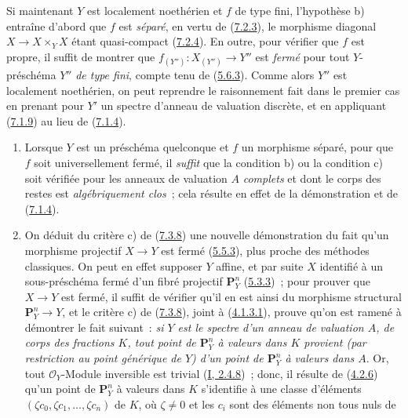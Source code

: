 Si maintenant $Y$ est localement noethérien et $f$ de type fini, l'hypothèse
b) entraîne d'abord que $f$ est \emph{séparé}, en vertu de
(\hyperref[II.7.2.3-fr]{7.2.3}), le morphisme diagonal $X\to X\times_YX$
étant quasi-compact (\hyperref[II.7.2.4-fr]{7.2.4}). En outre, pour vérifier
que $f$ est propre, il suffit de montrer que $f_{(Y'')}:X_{(Y'')}\to Y''$ est
\emph{fermé} pour tout $Y$-préschéma $Y''$ \emph{de type fini}, compte tenu de
(\hyperref[II.5.6.3-fr]{5.6.3}). Comme alors $Y''$ est localement noethérien,
on peut reprendre le raisonnement fait dans le premier cas en prenant pour
$Y'$ un spectre d'anneau de valuation discrète, et en appliquant
(\hyperref[II.7.1.9-fr]{7.1.9}) au lieu de
(\hyperref[II.7.1.4-fr]{7.1.4}).

\begin{remark}[7.3.9]
\label{II.7.3.9-fr}
\begin{enumerate}
\item[\rm (i)] Lorsque $Y$ est un préschéma quelconque et $f$ un morphisme
séparé, pour que $f$ soit universellement fermé, il \emph{suffit} que la
condition b) ou la condition c) soit vérifiée pour les anneaux de valuation
$A$ \emph{complets} et dont le corps des restes est \emph{algébriquement
clos}~; cela résulte en effet de la démonstration et de
(\hyperref[II.7.1.4-fr]{7.1.4}).
\item[\rm (ii)] On déduit du critère c) de
(\hyperref[II.7.3.8-fr]{7.3.8}) une nouvelle démonstration du fait qu'un
morphisme projectif $X\to Y$ est fermé (\hyperref[II.5.5.3-fr]{5.5.3}), plus
proche des méthodes classiques. On peut en effet supposer $Y$ affine, et par
suite $X$ identifié à un sous-préschéma fermé d'un fibré projectif
$\mathbf{P}_Y^n$ (\hyperref[II.5.3.3-fr]{5.3.3})~; pour prouver que $X\to Y$
est fermé, il suffit de vérifier qu'il en est ainsi du morphisme structural
$\mathbf{P}_Y^n\to Y$, et le critère c) de
(\hyperref[II.7.3.8-fr]{7.3.8}), joint à
(\hyperref[II.4.1.3.1-fr]{4.1.3.1}), prouve qu'on est ramené à démontrer le
fait suivant~: \emph{si $Y$ est le spectre d'un anneau de valuation $A$, de
corps des fractions $K$, tout point de $\mathbf{P}_Y^n$ à valeurs dans $K$
provient (par restriction au point générique de $Y$) d'un point de
$\mathbf{P}_Y^n$ à valeurs dans $A$}. Or, tout $\mathcal{O}_Y$-Module
inversible est trivial (\hyperref[I.2.4.8-fr]{I, 2.4.8})~; donc, il résulte de
(\hyperref[II.4.2.6-fr]{4.2.6}) qu'un point de $\mathbf{P}_Y^n$ à valeurs dans
$K$ s'identifie à une classe d'éléments $(\zeta c_0,\zeta c_1,\ldots,\zeta
c_n)$ de $K$, où $\zeta\neq0$ et les $c_i$ sont des éléments non tous nuls de

\end{enumerate}
\end{remark}
